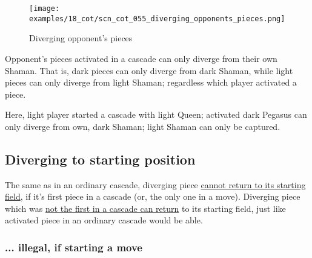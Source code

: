 \vspace*{-1.4\baselineskip}
\noindent
\begin{figure}[!h]
\texttt{[image: examples/18\_cot/scn\_cot\_055\_diverging\_opponents\_pieces.png]}
\vspace*{-1.3\baselineskip}
\caption{Diverging opponent's pieces}
\label{fig:scn_cot_055_diverging_opponents_pieces}
\end{figure}

\vspace*{-0.5\baselineskip}
Opponent's pieces activated in a cascade can only diverge from their own Shaman.
That is, dark pieces can only diverge from dark Shaman, while light pieces can only
diverge from light Shaman; regardless which player activated a piece.

Here, light player started a cascade with light Queen; activated dark Pegasus
can only diverge from own, dark Shaman; light Shaman can only be captured.

\clearpage %

\subsection*{Diverging to starting position}
\label{sec:Conquest of Tlalocan/Divergence/Diverging to starting position}

\vspace*{-0.7\baselineskip}
The same as in an ordinary cascade, diverging piece
\hyperref[fig:scn_mv_46_static_move_is_illegal_init]{cannot return to its starting field},
if it's first piece in a cascade (or, the only one in a move). Diverging piece which was
\hyperref[fig:scn_mv_48_static_piece_is_legal_init]{not the first in a cascade can return}
to its starting field, just like activated piece in an ordinary cascade would be able.

\vspace*{-0.7\baselineskip}
\subsubsection*{... illegal, if starting a move}
\label{sec:Conquest of Tlalocan/Divergence/Diverging to starting position/... illegal, if starting a move}

